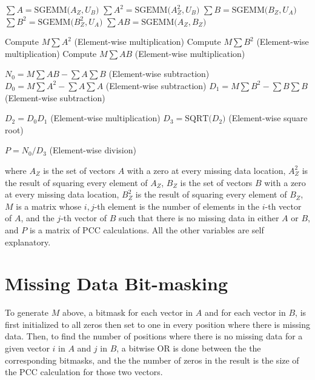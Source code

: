\documentclass{bioinfo}
\begin{document}
\begin{algorithmic}[1]

  \STATE $\sum A=\text{SGEMM(}A_Z,U_B\text{)}$
  \STATE $\sum A^2=\text{SGEMM(}A_Z^2,U_B\text{)}$
  \STATE $\sum B=\text{SGEMM(}B_Z,U_A\text{)}$
  \STATE $\sum B^2=\text{SGEMM(}B_Z^2,U_A\text{)}$
  \STATE $\sum AB=\text{SGEMM(}A_Z,B_Z\text{)}$
  
  \vspace{2mm}

  \STATE Compute $M\sum A^2$   (Element-wise multiplication)
  \STATE Compute $M\sum B^2$   (Element-wise multiplication)
  \STATE Compute $M\sum AB$   (Element-wise multiplication)
  
  \vspace{2mm}

  \STATE $N_0=M\sum AB - \sum A\sum B$   (Element-wise subtraction)
  \STATE $D_0=M\sum A^2 - \sum A\sum A$   (Element-wise subtraction)
  \STATE $D_1=M\sum B^2 - \sum B\sum B$   (Element-wise subtraction)

  \vspace{2mm}

  \STATE $D_2=D_0 D_1 $   (Element-wise multiplication)
  \STATE $D_3=\text{SQRT(}D_2\text{)}$   (Element-wise square root)

  \vspace{2mm}

  \STATE $P=N_0 / D_3$   (Element-wise division)
  
\end{algorithmic}

\noindent where  $A_Z$ is the set of vectors $A$ with a zero at every 
missing data location, $A_Z^2$ is the result of squaring every element 
of $A_Z$, $B_Z$ is the set of vectors $B$ with a zero at every 
missing data location, $B_Z^2$ is the result of squaring every element 
of $B_Z$, $M$ is a matrix whose $i, j$-th element is the number of 
elements in the $i$-th vector of $A$, and the $j$-th vector of $B$ 
such that there is no missing data in either $A$ or $B$, and $P$ is 
a matrix of PCC calculations. All the other variables are self explanatory.

\section{Missing Data Bit-masking} \label{MDBM}

To generate $M$ above, a bitmask for each vector in $A$ and for each vector in $B$, 
is first initialized to all zeros then set to one in every position where there is missing data.
Then, to find the number of positions where there is no missing data for a given vector $i$ 
in $A$ and $j$ in $B$, a bitwise OR is done between the the corresponding bitmasks, and the 
the number of zeros in the result is the size of the PCC calculation for those two vectors.
\end{document}
